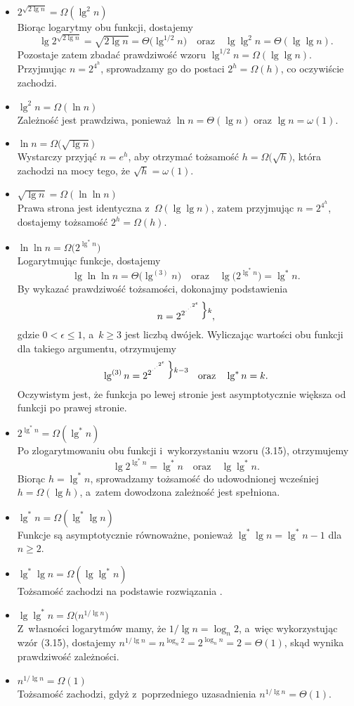 \begin{itemize}
\item $2^{\sqrt{2\lg n}}=\Omega(\lg^2 n)$ \\
	Biorąc logarytmy obu funkcji, dostajemy
	\[
		\lg2^{\sqrt{2\lg n}} = \sqrt{2\lg n} = \Theta\bigl(\lg^{1/2}n\bigr) \quad\text{oraz}\quad \lg\lg^2n = \Theta(\lg\lg n).
	\]
	Pozostaje zatem zbadać prawdziwość wzoru $\lg^{1/2}n=\Omega(\lg\lg n)$.
Przyjmując $n=2^{4^h}$, sprowadzamy go do postaci $2^h=\Omega(h)$, co oczywiście zachodzi.
\item $\lg^2n=\Omega(\ln n)$ \\
	Zależność jest prawdziwa, ponieważ $\ln n=\Theta(\lg n)$ oraz $\lg n=\omega(1)$.
\item $\ln n=\Omega\bigl(\!\sqrt{\lg n}\bigr)$ \\
	Wystarczy przyjąć $n=e^h$, aby otrzymać tożsamość $h=\Omega\bigl(\!\sqrt{h}\bigr)$, która zachodzi na mocy tego, że $\sqrt{h}=\omega(1)$.
\item $\sqrt{\lg n}=\Omega(\ln\ln n)$ \\
	Prawa strona jest identyczna z~$\Omega(\lg\lg n)$, zatem przyjmując $n=2^{4^h}$, dostajemy tożsamość $2^h=\Omega(h)$.
\item $\ln\ln n=\Omega\bigl(2^{\lg^*n}\bigr)$ \\
	Logarytmując funkcje, dostajemy
	\[
		\lg\ln\ln n = \Theta\bigl(\lg^{(3)}n\bigr) \quad\text{oraz}\quad \lg\bigl(2^{\lg^*n}\bigr) = \lg^*n.
	\]
	By wykazać prawdziwość tożsamości, dokonajmy podstawienia
	\[
		n = 2^{2^{\cdot^{\cdot^{\cdot^{2^\epsilon}}}}}\vbox{\hbox{$\Big\}\scriptstyle k$}\kern0pt},
	\]
	gdzie $0<\epsilon\le1$, a~$k\ge3$ jest liczbą dwójek.
Wyliczając wartości obu funkcji dla takiego argumentu, otrzymujemy
	\[
		\lg^{(3)}n = 2^{2^{\cdot^{\cdot^{\cdot^{2^\epsilon}}}}}\vbox{\hbox{$\Big\}\scriptstyle k-3$}\kern0pt} \quad\text{oraz}\quad \lg^*n=k.
	\]
	Oczywistym jest, że funkcja po lewej stronie jest asymptotycznie większa od funkcji po prawej stronie.
\item $2^{\lg^*n}=\Omega(\lg^*n)$ \\
	Po zlogarytmowaniu obu funkcji i~wykorzystaniu wzoru (3.15), otrzymujemy
	\[
		\lg2^{\lg^*n} = \lg^*n \quad\text{oraz}\quad \lg\lg^*n.
	\]
	Biorąc $h=\lg^*n$, sprowadzamy tożsamość do udowodnionej wcześniej $h=\Omega(\lg h)$, a~zatem dowodzona zależność jest spełniona.
\item $\lg^*n=\Omega(\lg^*\lg n)$ \\
	Funkcje są asymptotycznie równoważne, ponieważ $\lg^*\lg n=\lg^*n-1$ dla $n\ge2$.
\item $\lg^*\lg n=\Omega(\lg\lg^*n)$ \\
	Tożsamość zachodzi na podstawie rozwiązania .
\item $\lg\lg^*n=\Omega\bigl(n^{1/\!\lg n}\bigr)$ \\
	Z~własności logarytmów mamy, że $1/\!\lg n=\log_n2$, a~więc wykorzystując wzór (3.15), dostajemy $n^{1/\!\lg n}=n^{\log_n2}=2^{\log_nn}=2=\Theta(1)$, skąd wynika prawdziwość zależności.
\item $n^{1/\!\lg n}=\Omega(1)$ \\
	Tożsamość zachodzi, gdyż z~poprzedniego uzasadnienia $n^{1/\!\lg n}=\Theta(1)$.
\end{itemize}

